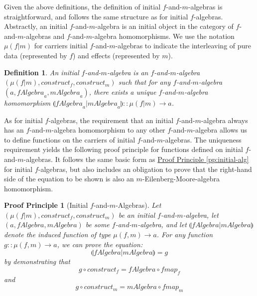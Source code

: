\documentclass{jfp1}
\newcommand{\eFold}[2]{\llparenthesis #1|#2 \rrparenthesis}
\newtheorem{definition}{Definition}
\newtheorem{proofprinciple}{Proof Principle}
\newcommand{\proofprinref}[1]{\hyperref[#1]{Proof Principle \ref*{#1}}}
\begin{document}
Given the above definitions, the definition of initial
$f$-and-$m$-algebras is straightforward, and follows the same
structure as for initial $f$-algebras. Abstractly, an initial
$f$-and-$m$-algebra is an initial object in the category of
$f$-and-$m$-algebras and $f$-and-$m$-algebra homomorphisms. We use the
notation $\mu(f|m)$ for carriers initial $f$-and-$m$-algebras to
indicate the interleaving of pure data (represented by $f$) and
effects (represented by $m$).

\begin{definition}
  An \emph{initial $f$-and-$m$-algebra} is an $f$-and-$m$-algebra
  $(\mu(f|m), \mathit{construct}_f, \mathit{construct}_m)$ such that
  for any $f$-and-$m$-algebra $(a, \mathit{fAlgebra}_a,
  \mathit{mAlgebra}_a)$, there exists a unique $f$-and-$m$-algebra
  homomorphism $\eFold{\mathit{fAlgebra}_a}{\mathit{mAlgebra}_a} ::
  \mu(f|m) \to a$.
\end{definition}

As for initial $f$-algebras, the requirement that an initial
$f$-and-$m$-algebra always has an $f$-and-$m$-algebra homomorphism to
any other $f$-and-$m$-algebra allows us to define functions on the
carriers of initial $f$-and-$m$-algebras. The uniqueness requirement
yields the following proof principle for functions defined on initial
$f$-and-$m$-algebras. It follows the same basic form as
\proofprinref{pp:initial-alg} for initial $f$-algebras, but also
includes an obligation to prove that the right-hand side of the
equation to be shown is also an $m$-Eilenberg-Moore-algebra
homomorphism.

\begin{proofprinciple}[Initial $f$-and-$m$-Algebras]
  \label{pp:initial-f-m-alg}
  Let $(\mu(f|m), \mathit{construct}_f, \mathit{construct}_m)$ be an
  initial $f$-and-$m$-algebra, let $(a, \mathit{fAlgebra},
  \mathit{mAlgebra})$ be some $f$-and-$m$-algebra, and let
  $\eFold{\mathit{fAlgebra}}{\mathit{mAlgebra}}$ denote the induced
  function of type $\mu(f,m) \to a$. For any function $g :: \mu(f,m)
  \to a$, we can prove the equation:
  \begin{displaymath}
    \eFold{\mathit{fAlgebra}}{\mathit{mAlgebra}} = g
  \end{displaymath}
  by demonstrating that
  \begin{equation}\label{eq:fm-falg}
    g \circ \mathit{construct}_f = \mathit{fAlgebra} \circ \mathit{fmap}_f
  \end{equation}
  and
  \begin{displaymath}\label{eq:fm-malg}
    g \circ \mathit{construct}_m = \mathit{mAlgebra} \circ \mathit{fmap}_m
  \end{displaymath}
\end{proofprinciple}
\end{document}
